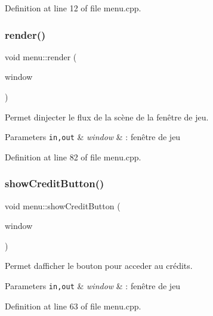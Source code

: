 Definition at line 12 of file menu.\+cpp.

\mbox{\label{namespacemenu_a36909d583ee0b8fd45d25570c921a2b8}} 
\subsubsection{\texorpdfstring{render()}{render()}}
{\footnotesize\ttfamily void menu\+::render (\begin{DoxyParamCaption}\item[{\hyperlink{class_min_g_l}{Min\+GL} \&}]{window }\end{DoxyParamCaption})}



Permet d\textquotesingle{}injecter le flux de la scène de la fenêtre de jeu. 


\begin{DoxyParams}[1]{Parameters}
\mbox{\tt in,out}  & {\em window} & \+: fenêtre de jeu \\
\hline
\end{DoxyParams}


Definition at line 82 of file menu.\+cpp.

\mbox{\label{namespacemenu_aae0e9f6825309dcf954f9d175d46d750}} 
\subsubsection{\texorpdfstring{show\+Credit\+Button()}{showCreditButton()}}
{\footnotesize\ttfamily void menu\+::show\+Credit\+Button (\begin{DoxyParamCaption}\item[{\hyperlink{class_min_g_l}{Min\+GL} \&}]{window }\end{DoxyParamCaption})}



Permet d\textquotesingle{}afficher le bouton pour acceder au crédits. 


\begin{DoxyParams}[1]{Parameters}
\mbox{\tt in,out}  & {\em window} & \+: fenêtre de jeu \\
\hline
\end{DoxyParams}


Definition at line 63 of file menu.\+cpp.

